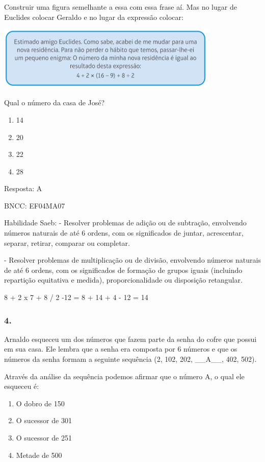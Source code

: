 Construir uma figura semelhante a essa com essa frase aí. Mas no lugar
de Euclides colocar Geraldo e no lugar da expressão colocar:

\includegraphics[width=4.19231in,height=1.20373in]{media/image165.png}

Qual o número da casa de José?

\begin{enumerate}
\def\labelenumi{\alph{enumi})}
\item
  14
\item
  20
\item
  22
\item
  28
\end{enumerate}

Resposta: A

BNCC: EF04MA07

Habilidade Saeb: - Resolver problemas de adição ou de subtração,
envolvendo números naturais de até 6 ordens, com os significados de
juntar, acrescentar, separar, retirar, comparar ou completar.

- Resolver problemas de multiplicação ou de divisão, envolvendo números
naturais de até 6 ordens, com os significados de formação de grupos
iguais (incluindo repartição equitativa e medida), proporcionalidade ou
disposição retangular.

8 + 2 x 7 + 8 / 2 -12 = 8 + 14 + 4 - 12 = 14

\subsubsection{4. }\label{section-190}

Arnaldo esqueceu um dos números que fazem parte da senha do cofre que
possui em sua casa. Ele lembra que a senha era composta por 6 números e
que os números da senha formam a seguinte sequência (2, 102, 202,
\_\_A\_\_, 402, 502).

Através da análise da sequência podemos afirmar que o número A, o qual
ele esqueceu é:

\begin{enumerate}
\def\labelenumi{\alph{enumi})}
\item
  O dobro de 150
\item
  O sucessor de 301
\item
  O sucessor de 251
\item
  Metade de 500
\end{enumerate}

